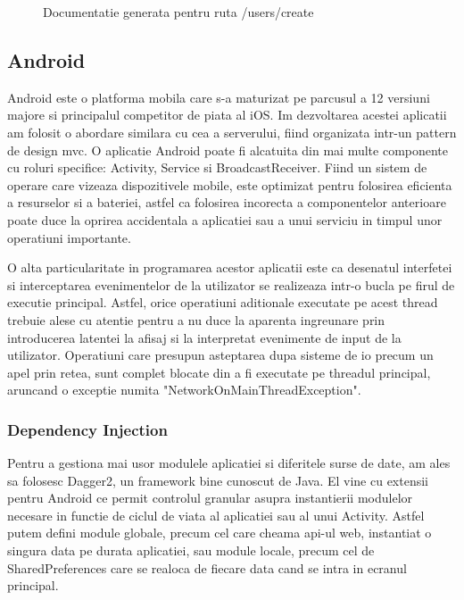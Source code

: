 \begin{figure}[H]
  \centering
  \caption{Documentatie generata pentru ruta /users/create}
\end{figure}

\subsection {Android}

Android este o platforma mobila care s-a maturizat pe parcusul a 12 versiuni majore si principalul competitor de piata al iOS. Im dezvoltarea acestei aplicatii am folosit o abordare similara cu cea a serverului, fiind organizata intr-un pattern de design \acrshort{mvc}. O aplicatie Android poate fi alcatuita din mai multe componente cu roluri specifice: Activity, Service si BroadcastReceiver. Fiind un sistem de operare care vizeaza dispozitivele mobile, este optimizat pentru folosirea eficienta a resurselor si a bateriei, astfel ca folosirea incorecta a componentelor anterioare poate duce la oprirea accidentala a aplicatiei sau a unui serviciu in timpul unor operatiuni importante.

O alta particularitate in programarea acestor aplicatii este ca desenatul interfetei si interceptarea evenimentelor de la utilizator se realizeaza intr-o bucla pe firul de executie principal. Astfel, orice operatiuni aditionale executate pe acest thread trebuie alese cu atentie pentru a nu duce la aparenta ingreunare prin introducerea latentei la afisaj si la interpretat evenimente de input de la utilizator. Operatiuni care presupun asteptarea dupa sisteme de \acrshort{io} precum un apel prin retea, sunt complet blocate din a fi executate pe threadul principal, aruncand o exceptie numita "NetworkOnMainThreadException".

\subsubsection {Dependency Injection}

Pentru a gestiona mai usor modulele aplicatiei si diferitele surse de date, am ales sa folosesc Dagger2, un framework bine cunoscut de Java. El vine cu extensii pentru Android ce permit controlul granular asupra instantierii modulelor necesare in functie de ciclul de viata al aplicatiei sau al unui Activity. Astfel putem defini module globale, precum cel care cheama api-ul web, instantiat o singura data pe durata aplicatiei, sau module locale, precum cel de SharedPreferences care se realoca de fiecare data cand se intra in ecranul principal.

